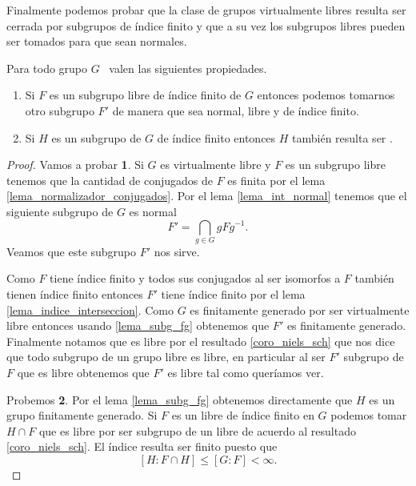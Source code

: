 \documentclass[tesis.tex]{subfiles}
\begin{document}
Finalmente podemos probar que la clase de grupos virtualmente libres resulta ser cerrada por subgrupos de índice finito y que a su vez los subgrupos libres pueden ser tomados para que sean normales.

\begin{prop}\label{prop_vls}
	Para todo grupo $G$ \vl \ valen las siguientes propiedades.
	\begin{enumerate}
		\item Si $F$ es un subgrupo libre de índice finito de $G$ entonces podemos tomarnos otro subgrupo $F'$ de manera que sea normal, libre y de índice finito.
		\item Si $H$ es un subgrupo de $G$ de índice finito entonces $H$ también resulta ser \vl.
	\end{enumerate}
\end{prop}

\begin{proof}
	Vamos a probar \textbf{1}.
	Si $G$ es virtualmente libre y $F$ es un subgrupo libre tenemos que la cantidad de conjugados de $F$ es finita por el lema \ref{lema_normalizador_conjugados}.
	Por el lema \ref{lema_int_normal} tenemos que el siguiente subgrupo de $G$ es normal
	\[
	F' = \bigcap_{g \in G} gFg^{-1}.
	\]
	Veamos que este subgrupo $F'$ nos sirve. 
	
	
	Como $F$ tiene índice finito y todos sus conjugados al ser isomorfos a $F$ también tienen índice finito entonces $F'$ tiene índice finito por el lema \ref{lema_indice_interseccion}.
	Como $G$ es finitamente generado por ser virtualmente libre entonces usando \ref{lema_subg_fg} obtenemos que $F'$ es finitamente generado.
	Finalmente notamos que es libre por el resultado \ref{coro_niels_sch} que nos dice que todo subgrupo de un grupo libre es libre, en particular al ser $F'$ subgrupo de $F$ que es libre obtenemos que $F'$ es libre tal como queríamos ver.
	
	Probemos \textbf{2}. 
	Por el lema \ref{lema_subg_fg} obtenemos directamente que $H$ es un grupo finitamente generado.
	Si $F$ es un libre de índice finito en $G$ podemos tomar $H \cap F$ que es libre por ser subgrupo de un libre de acuerdo al resultado \ref{coro_niels_sch}.
	El índice resulta ser finito puesto que 
	\[
	[H:F\cap H] \le [G:F] < \infty.
	\]
\end{proof}
\end{document}
